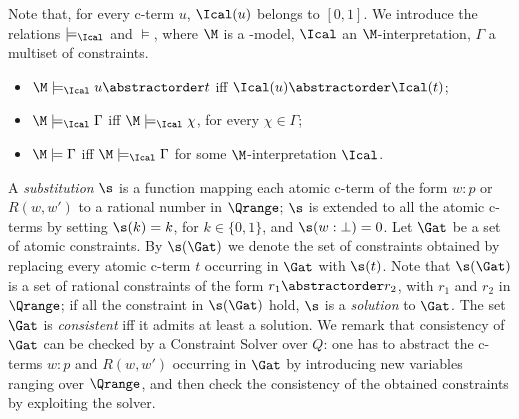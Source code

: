 Note that, for every c-term $u$, $\Ical(u)$ belongs to $[0,1]$.
 We introduce the relations
$\models_\Ical$ and $\models$, where $\M$ is a \GWM-model, $\Ical$ an
$\M$-interpretation, $\Gamma$ a multiset of constraints.
\begin{itemize}
\item $\M\models_\Ical u \abstractorder t$ iff   $\Ical(u)  \abstractorder \Ical(t)$;
  
\item $\M\models_\Ical \Gamma$ iff $\M\models_\Ical\chi$, for every
  $\chi\in\Gamma$;

\item $\M\models \Gamma$ iff $\M\models_\Ical \Gamma$ for some
  $\M$-interpretation $\Ical$.
\end{itemize}
A \emph{substitution} $\s$ is a function mapping each atomic c-term of
the form $w : p$ or $R(w,w')$ to a rational number in $\Qrange$; $\s$
is extended to all the atomic c-terms by setting $\s(k)=k$, for
$k\in\{0,1\}$, and $\s(w:\bot)=0$.  Let $\Gat$ be a set of atomic
constraints.  By $\s(\Gat)$ we denote the set of constraints obtained
by replacing every atomic c-term $t$ occurring in $\Gat$ with $\s(t)$.
Note that $\s(\Gat)$ is a set of rational constraints of the form $r_1
\abstractorder r_2$, with $r_1$ and $r_2$ in $\Qrange$;
if all the constraint in $\s(\Gat)$ hold, 
$\s$ is a  \emph{solution} to $\Gat$.
The set $\Gat$ is \emph{consistent} iff it admits at least a solution.
We remark that consistency of $\Gat$ can be checked by a Constraint
Solver over $Q$: one has to abstract the c-terms $w : p$ and $R(w,w')$
occurring in $\Gat$ by introducing new variables ranging over
$\Qrange$, and then check the consistency of the obtained constraints
by exploiting the solver.



